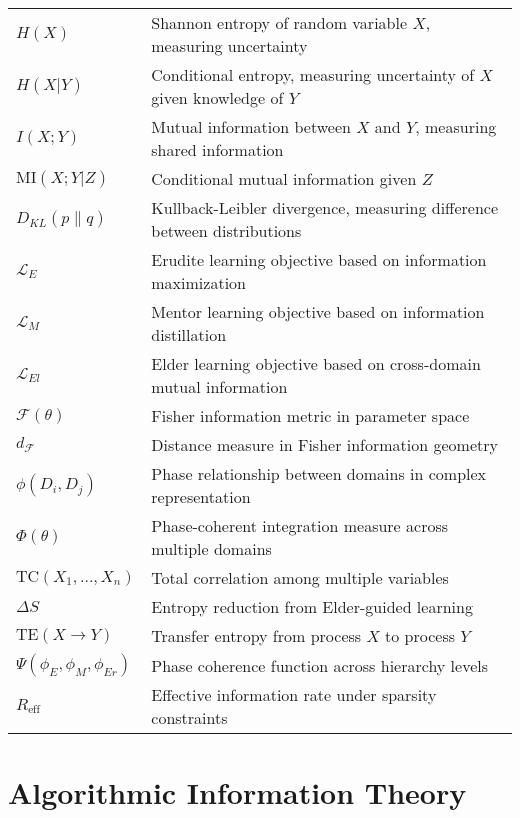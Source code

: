 \begin{tabular}{p{3cm} p{12cm}}
$H(X)$ & Shannon entropy of random variable $X$, measuring uncertainty \\
$H(X|Y)$ & Conditional entropy, measuring uncertainty of $X$ given knowledge of $Y$ \\
$I(X;Y)$ & Mutual information between $X$ and $Y$, measuring shared information \\
$\text{MI}(X;Y|Z)$ & Conditional mutual information given $Z$ \\
$D_{KL}(p \| q)$ & Kullback-Leibler divergence, measuring difference between distributions \\
$\mathcal{L}_E$ & Erudite learning objective based on information maximization \\
$\mathcal{L}_M$ & Mentor learning objective based on information distillation \\
$\mathcal{L}_{El}$ & Elder learning objective based on cross-domain mutual information \\
$\mathcal{F}(\theta)$ & Fisher information metric in parameter space \\
$d_{\mathcal{F}}$ & Distance measure in Fisher information geometry \\
$\phi(D_i, D_j)$ & Phase relationship between domains in complex representation \\
$\Phi(\theta)$ & Phase-coherent integration measure across multiple domains \\
$\text{TC}(X_1,...,X_n)$ & Total correlation among multiple variables \\
$\Delta S$ & Entropy reduction from Elder-guided learning \\
$\text{TE}(X \rightarrow Y)$ & Transfer entropy from process $X$ to process $Y$ \\
$\Psi(\phi_E, \phi_M, \phi_{Er})$ & Phase coherence function across hierarchy levels \\
$R_{\text{eff}}$ & Effective information rate under sparsity constraints \\
\end{tabular}

\section*{Algorithmic Information Theory}

